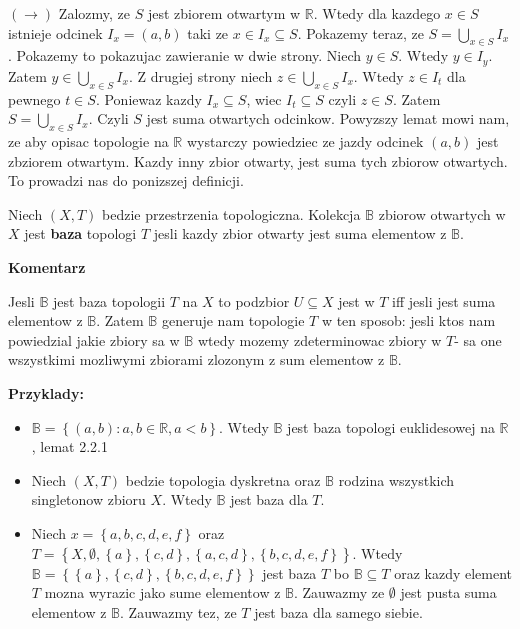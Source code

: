 \documentclass{article}
\begin{document}
$(\rightarrow)$ Zalozmy, ze $S$ jest zbiorem otwartym w $\mathbb{R}$. Wtedy dla kazdego $x \in S$ istnieje odcinek $I_{x} = (a,b)$ taki ze $x \in I_{x} \subseteq S$. Pokazemy teraz, ze $S = \bigcup\limits_{x \in S}I_{x}$.
Pokazemy to pokazujac zawieranie w dwie strony. 
Niech $y \in S$. Wtedy $y \in I_{y}$. Zatem $y \in \bigcup\limits_{x \in S}I_{x}$. Z drugiej strony niech $z \in \bigcup\limits_{x \in S}I_{x}$. Wtedy $z \in I_{t}$ dla pewnego $t \in S$. Poniewaz kazdy $I_{x} \subseteq S$, wiec $I_{t} \subseteq S$ czyli $z\in S$. Zatem $S = \bigcup\limits_{x \in S}I_{x}$. Czyli $S$ jest suma otwartych odcinkow. 
\vspace{5mm}
Powyzszy lemat mowi nam, ze aby opisac topologie na $\mathbb{R}$ wystarczy powiedziec ze jazdy odcinek $(a,b)$ jest zbziorem otwartym. Kazdy inny zbior otwarty, jest suma tych zbiorow otwartych. To prowadzi nas do ponizszej definicji.

\begin{tcolorbox}[colback=white!90!red,colframe=black!35!red,title=2.2.2 Definicja: Baza topologii]

    Niech $(X,T)$ bedzie przestrzenia topologiczna. Kolekcja $\mathbb{B}$ zbiorow otwartych w $X$ jest \textbf{baza} topologi $T$ jesli kazdy zbior otwarty jest suma elementow z $\mathbb{B}$.

\end{tcolorbox}


\textbf{Komentarz}

Jesli $\mathbb{B}$ jest baza topologii $T$ na $X$ to podzbior $U \subseteq X$ jest w $T$ iff jesli jest suma elementow z $\mathbb{B}$. Zatem $\mathbb{B}$ generuje nam topologie $T$ w ten sposob: jesli ktos nam powiedzial jakie zbiory sa w $\mathbb{B}$ wtedy mozemy zdeterminowac zbiory w $T$- sa one wszystkimi mozliwymi zbiorami zlozonym z sum elementow z $\mathbb{B}$.

\textbf{Przyklady:}
\begin{itemize}
    \item $\mathbb{B} = \left\{ (a,b): a,b \in \mathbb{R}, a<b \right\}$. Wtedy $\mathbb{B}$ jest baza topologi euklidesowej na $\mathbb{R}$, lemat 2.2.1
    \item Niech $(X,T)$ bedzie topologia dyskretna oraz $\mathbb{B}$ rodzina wszystkich singletonow zbioru $X$. Wtedy $\mathbb{B}$ jest baza dla $T$.
    \item Niech $x = \left\{ a,b,c,d,e,f \right\}$ oraz $T = \left\{ X, \emptyset, \left\{ a \right\}, \left\{ c,d \right\}, \left\{ a,c,d \right\}, \left\{ b,c,d,e,f \right\}   \right\}$. Wtedy $\mathbb{B} = \left\{ \left\{ a \right\}, \left\{ c,d \right\}, \left\{ b,c,d,e,f \right\}  \right\}$ jest baza $T$ bo $\mathbb{B} \subseteq T$ oraz kazdy element $T$ mozna wyrazic jako sume elementow z $\mathbb{B}$. Zauwazmy ze $\emptyset$ jest pusta suma elementow z $\mathbb{B}$. Zauwazmy tez, ze $T$ jest baza dla samego siebie.
\end{itemize}
\end{document}
